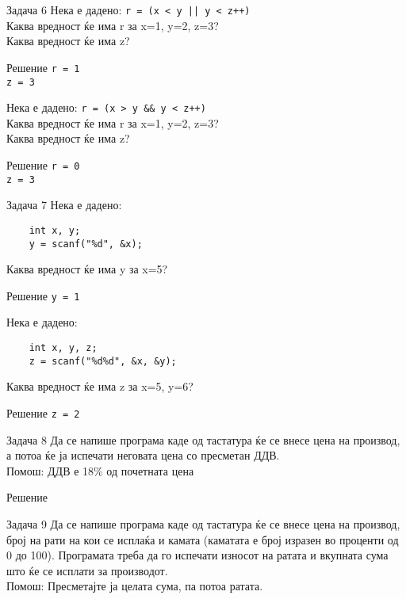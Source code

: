 \begin{frame}[fragile]{Задача 6}
Нека е дадено: \texttt{r = (x < y || y < z++)}\\
	Каква вредност ќе има r за x=1, y=2, z=3?\\
	Каква вредност ќе има z?
	\begin{exampleblock}{Решение}
	\texttt{r = 1\\z = 3}
	\end{exampleblock}
Нека е дадено: \texttt{r = (x > y \&\& y < z++)}\\
	Каква вредност ќе има r за x=1, y=2, z=3?\\
	Каква вредност ќе има z?
	\begin{exampleblock}{Решение}
	\texttt{r = 0\\z = 3}
	\end{exampleblock}
\end{frame}

\begin{frame}[fragile]{Задача 7}
Нека е дадено:
\begin{lstlisting}
	int x, y;
	y = scanf("%d", &x);
\end{lstlisting}
Каква вредност ќе има y за x=5?
	\begin{exampleblock}{Решение}
	\texttt{y = 1}
	\end{exampleblock}
Нека е дадено:
\begin{lstlisting}
	int x, y, z;
	z = scanf("%d%d", &x, &y);
\end{lstlisting}
	Каква вредност ќе има z за x=5, y=6?
	\begin{exampleblock}{Решение}
	\texttt{z = 2}
	\end{exampleblock}
\end{frame}


\begin{frame}[fragile]{Задача 8}
Да се напише програма каде од тастатура ќе се внесе цена на производ, а потоа ќе ја испечати неговата цена со пресметан ДДВ.\\
Помош: ДДВ е 18\% од почетната цена
	\begin{exampleblock}{Решение}
		
	\end{exampleblock}
\end{frame}


\begin{frame}[fragile]{Задача 9}
Да се напише програма каде од тастатура ќе се внесе цена на производ, број на рати на кои се исплаќа и 
камата (каматата е број изразен во проценти од 0 до 100). 
Програмата треба да го испечати износот на ратата и вкупната сума што ќе се исплати за производот.\\
Помош: Пресметајте ја целата сума, па потоа ратата.
\end{frame}

